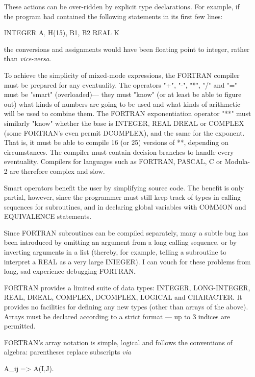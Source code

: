 These actions can be over-ridden by explicit type declarations. For example, if the program had contained the following statements in its first few lines:

\begin{code}
INTEGER A, H(15), B1, B2 
REAL K
\end{code}

the conversions and assignments would have been floating point to integer, rather than \textit{vice-versa}.

To achieve the simplicity of mixed-mode expressions, the FORTRAN compiler must be prepared for any eventuality. The operators "+", "-", "*", "/" and "=" must be "smart" (overloaded)— they must "know" (or at least be able to figure out) what kinds of numbers are going to be used and what kinds of arithmetic will be used to combine them. The FORTRAN exponentiation operator "**" must similarly "know" whether the base is INTEGER, REAL DREAL or COMPLEX (some FORTRAN's even permit DCOMPLEX), and the same for the exponent. That is, it must be able to compile 16 (or 25) versions of **, depending on circumstances. The compiler must contain decision branches to handle every eventuality. Compilers for languages such as FORTRAN, PASCAL, C or Modula-2 are therefore complex and slow.

Smart operators benefit the user by simplifying source code. The benefit is only partial, however, since the programmer must still keep track of types in calling sequences for subroutines, and in declaring global variables with COMMON and EQUIVALENCE statements.
 
Since FORTRAN subroutines can be compiled separately, many a subtle bug has been introduced by omitting an argument from a long calling sequence, or by inverting arguments in a list (thereby, for example, telling a subroutine to interpret a REAL as a very large INIEGER). I can vouch for these problems from long, sad experience debugging FORTRAN.

FORTRAN provides a limited suite of data types: INTEGER, LONG-INTEGER, REAL, DREAL, COMPLEX, DCOMPLEX, LOGICAL and CHARACTER. It provides no facilities for defining any new types (other than arrays of the above). Arrays must be declared according to a strict format — up to 3 indices are permitted.

FORTRAN's array notation is simple, logical and follows the conventions of algebra: parentheses replace subscripts \textit{via}

\begin{code}
A_{ij} => A(I,J).
\end{code}

